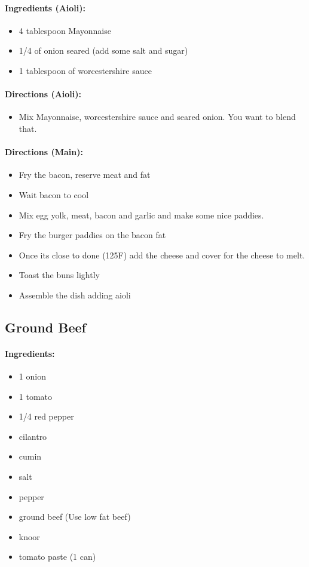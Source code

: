 \documentclass{article}
\begin{document}
\paragraph{Ingredients (Aioli):}
\begin{itemize}
    \item 4 tablespoon Mayonnaise
    \item 1/4 of onion seared (add some salt and sugar)
    \item 1 tablespoon of worcestershire sauce
\end{itemize}  

\paragraph{Directions (Aioli):}
\begin{itemize}
    \item Mix Mayonnaise, worcestershire sauce and seared onion. You want to blend that.
\end{itemize}  

\paragraph{Directions (Main):}
\begin{itemize}
    \item Fry the bacon, reserve meat and fat
    \item Wait bacon to cool
    \item Mix egg yolk, meat, bacon and garlic and make some nice paddies.
    \item Fry the burger paddies on the bacon fat
    \item Once its close to done (125F) add the cheese and cover for the cheese to melt.
    \item Toast the buns lightly
    \item Assemble the dish adding aioli
\end{itemize} 

\subsection{Ground Beef}

\paragraph{Ingredients:}
\begin{itemize}
    \item 1 onion
    \item 1 tomato
    \item 1/4 red pepper
    \item cilantro
    \item cumin
    \item salt
    \item pepper
    \item ground beef (Use low fat beef)
    \item knoor
    \item tomato paste (1 can)
\end{itemize}
\end{document}
